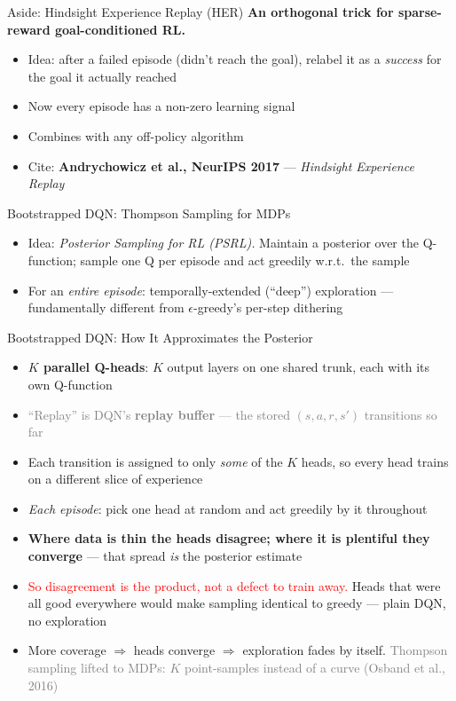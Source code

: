\begin{frame}{Aside: Hindsight Experience Replay (HER)}
\textbf{An orthogonal trick for sparse-reward goal-conditioned RL.}
\begin{itemize}
    \setlength{\itemsep}{0.55em}
    \item Idea: after a failed episode (didn't reach the goal), relabel it as a \emph{success} for the goal it actually reached
    \item Now every episode has a non-zero learning signal
    \item Combines with any off-policy algorithm
    \item Cite: \textbf{Andrychowicz et al., NeurIPS 2017} --- \emph{Hindsight Experience Replay}
\end{itemize}
\end{frame}

\begin{frame}{Bootstrapped DQN: Thompson Sampling for MDPs}
\begin{itemize}
    \setlength{\itemsep}{0.55em}
    \item Idea: \emph{Posterior Sampling for RL (PSRL).} Maintain a posterior over the Q-function; sample one Q per episode and act greedily w.r.t.\ the sample
    \item For an \emph{entire episode}: temporally-extended (``deep'') exploration --- fundamentally different from $\epsilon$-greedy's per-step dithering
\end{itemize}
\end{frame}

\begin{frame}{Bootstrapped DQN: How It Approximates the Posterior}
\begin{itemize}
    \setlength{\itemsep}{0.32em}
    \item \textbf{$K$ parallel Q-heads}: $K$ output layers on one shared trunk, each with its own Q-function
    \item \textcolor{gray}{``Replay'' is DQN's \textbf{replay buffer} --- the stored $(s,a,r,s')$ transitions so far}
    \item Each transition is assigned to only \emph{some} of the $K$ heads, so every head trains on a different slice of experience
    \item \emph{Each episode}: pick one head at random and act greedily by it throughout
    \item \textbf{Where data is thin the heads disagree; where it is plentiful they converge} --- that spread \emph{is} the posterior estimate
    \item \textcolor{red}{So disagreement is the product, not a defect to train away.} Heads that were all good everywhere would make sampling identical to greedy --- plain DQN, no exploration
    \item More coverage $\Rightarrow$ heads converge $\Rightarrow$ exploration fades by itself. \textcolor{gray}{Thompson sampling lifted to MDPs: $K$ point-samples instead of a curve (Osband et al., 2016)}
\end{itemize}
\end{frame}

